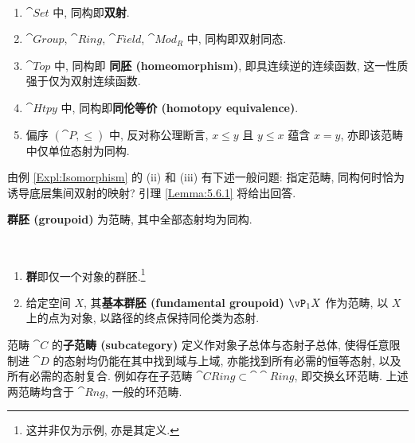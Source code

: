 \begin{example}\label{Expl:Isomorphism}
    \ \par
    \begin{enumerate}[label=(\roman*)]
        \item \(\cat{Set}\) 中, 同构即\textbf{双射}.
        \item \(\cat{Group}\), \(\cat{Ring}\), \(\cat{Field}\), \(\cat{Mod}_R\) 中, 同构即双射同态.
        \item \(\cat{Top}\) 中, 同构即 \textbf{同胚 (homeomorphism)}, 即具连续逆的连续函数, 这一性质强于仅为双射连续函数.
        \item \(\cat{Htpy}\) 中, 同构即\textbf{同伦等价 (homotopy equivalence)}.
        \item 偏序 \((\cat P,\le)\) 中, 反对称公理断言, \(x\le y\) 且 \(y\le x\) 蕴含 \(x=y\), 亦即该范畴中仅单位态射为同构.
    \end{enumerate}
\end{example}
\par 由例 \ref{Expl:Isomorphism} 的 (ii) 和 (iii) 有下述一般问题: 指定范畴, 同构何时恰为诱导底层集间双射的映射? 引理 \ref{Lemma:5.6.1} 将给出回答.
\begin{definition}
    \textbf{群胚 (groupoid)} 为范畴, 其中全部态射均为同构.
\end{definition}
\begin{example}
    \ \par
    \begin{enumerate}[label=(\roman*)]
        \item \textbf{群}即仅一个对象的群胚.\footnote{这并非仅为示例, 亦是其定义.\footnotemark}
        \item 给定空间 \(X\), 其\textbf{基本群胚 (fundamental groupoid)} \(\vP _1 X\) 作为范畴, 以 \(X\) 上的点为对象, 以路径的终点保持同伦类为态射.
    \end{enumerate}
\end{example}
\par 范畴 \(\cat C\) 的\textbf{子范畴 (subcategory)} 定义作对象子总体与态射子总体, 使得任意限制进 \(\cat D\) 的态射均仍能在其中找到域与上域, 亦能找到所有必需的恒等态射, 以及所有必需的态射复合. 例如存在子范畴 \(\cat{CRing}\subset\cat\cat{Ring}\), 即交换幺环范畴. 上述两范畴均含于 \(\cat{Rng}\),  一般的环范畴.
